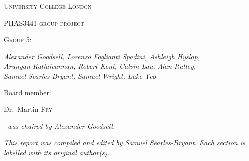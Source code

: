 \pagestyle{plain}

\begin{titlepage}
    \centering
    {\scshape\LARGE University College London \par}
    \vspace{1cm}
    {\scshape PHAS3441 group project\par}
    {\scshape Group 5:~\teamname\par}
    \vspace{1.5cm}
    {\huge\bfseries {} \projectTitle\par}
    \vspace{2cm}
    {\Large\itshape Alexander Goodsell, Lorenzo Foglianti Spadini, Ashleigh Hyslop,\\ Arunyan Kallaivannan, Robert Kent, Calvin Lau, Alan Rutley,\\ Samuel Searles-Bryant, Samuel Wright, Luke Yeo\par}
    \vfill
    Board member:\par
    Dr.~Martin \textsc{Fry}

    \vfill

    {\large \thedate\par}
\end{titlepage}

{\centering
{\itshape \teamname~was chaired by Alexander Goodsell.\par}
\vfill
{\itshape This report was compiled and edited by Samuel Searles-Bryant. Each section is labelled with its original author(s).\par}
\vfill
}

\cleardoublepage

\tableofcontents
